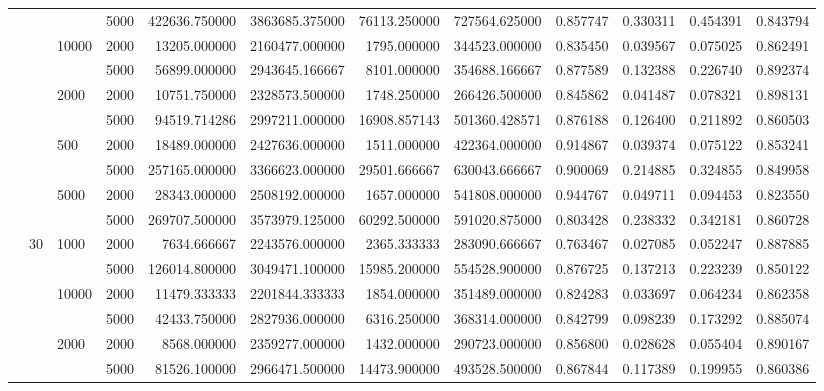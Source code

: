 \begin{tabular}{llllrrrrrrrr}
     &    &      & 5000 &  422636.750000 &  3863685.375000 &  76113.250000 &  727564.625000 &   0.857747 &  0.330311 &  0.454391 &  0.843794 \\
     &    & 10000 & 2000 &   13205.000000 &  2160477.000000 &   1795.000000 &  344523.000000 &   0.835450 &  0.039567 &  0.075025 &  0.862491 \\
     &    &      & 5000 &   56899.000000 &  2943645.166667 &   8101.000000 &  354688.166667 &   0.877589 &  0.132388 &  0.226740 &  0.892374 \\
     &    & 2000 & 2000 &   10751.750000 &  2328573.500000 &   1748.250000 &  266426.500000 &   0.845862 &  0.041487 &  0.078321 &  0.898131 \\
     &    &      & 5000 &   94519.714286 &  2997211.000000 &  16908.857143 &  501360.428571 &   0.876188 &  0.126400 &  0.211892 &  0.860503 \\
     &    & 500 & 2000 &   18489.000000 &  2427636.000000 &   1511.000000 &  422364.000000 &   0.914867 &  0.039374 &  0.075122 &  0.853241 \\
     &    &      & 5000 &  257165.000000 &  3366623.000000 &  29501.666667 &  630043.666667 &   0.900069 &  0.214885 &  0.324855 &  0.849958 \\
     &    & 5000 & 2000 &   28343.000000 &  2508192.000000 &   1657.000000 &  541808.000000 &   0.944767 &  0.049711 &  0.094453 &  0.823550 \\
     &    &      & 5000 &  269707.500000 &  3573979.125000 &  60292.500000 &  591020.875000 &   0.803428 &  0.238332 &  0.342181 &  0.860728 \\
     & 30 & 1000 & 2000 &    7634.666667 &  2243576.000000 &   2365.333333 &  283090.666667 &   0.763467 &  0.027085 &  0.052247 &  0.887885 \\
     &    &      & 5000 &  126014.800000 &  3049471.100000 &  15985.200000 &  554528.900000 &   0.876725 &  0.137213 &  0.223239 &  0.850122 \\
     &    & 10000 & 2000 &   11479.333333 &  2201844.333333 &   1854.000000 &  351489.000000 &   0.824283 &  0.033697 &  0.064234 &  0.862358 \\
     &    &      & 5000 &   42433.750000 &  2827936.000000 &   6316.250000 &  368314.000000 &   0.842799 &  0.098239 &  0.173292 &  0.885074 \\
     &    & 2000 & 2000 &    8568.000000 &  2359277.000000 &   1432.000000 &  290723.000000 &   0.856800 &  0.028628 &  0.055404 &  0.890167 \\
     &    &      & 5000 &   81526.100000 &  2966471.500000 &  14473.900000 &  493528.500000 &   0.867844 &  0.117389 &  0.199955 &  0.860386 \\

\end{tabular}
